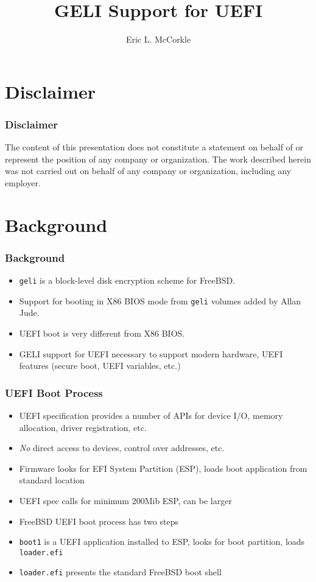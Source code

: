 \documentclass{beamer}
\title{GELI Support for UEFI}
\author{Eric L. McCorkle}
\begin{document}
\begin{frame}
  \titlepage{}
\end{frame}

\section{Disclaimer}

\begin{frame}
  \frametitle{Disclaimer}

  The content of this presentation does not constitute a statement on
  behalf of or represent the position of any company or organization.
  The work described herein was not carried out on behalf of any
  company or organization, including any employer.
\end{frame}

\section{Background}

\begin{frame}
  \frametitle{Background}
  \begin{itemize}
  \item \texttt{geli} is a block-level disk encryption scheme for FreeBSD.
  \item Support for booting in X86 BIOS mode from \texttt{geli}
    volumes added by Allan Jude.
  \item UEFI boot is very different from X86 BIOS.
  \item GELI support for UEFI necessary to support modern hardware,
    UEFI features (secure boot, UEFI variables, etc.)
  \end{itemize}
\end{frame}

\begin{frame}
  \frametitle{UEFI Boot Process}
  \begin{itemize}
  \item UEFI specification provides a number of APIs for device I/O,
    memory allocation, driver registration, etc.
  \item \emph{No} direct access to devices, control over addresses, etc.
  \item Firmware looks for EFI System Partition (ESP), loads boot
    application from standard location
  \item UEFI spec calls for minimum 200Mib ESP, can be larger
  \item FreeBSD UEFI boot process has two steps
  \item \texttt{boot1} is a UEFI application installed to ESP, looks
    for boot partition, loads \texttt{loader.efi}
  \item \texttt{loader.efi} presents the standard FreeBSD boot shell
  \end{itemize}
\end{frame}
\end{document}
